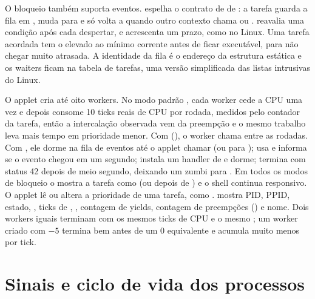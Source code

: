O bloqueio tamb\'em suporta eventos.  espelha o contrato de
 de : a tarefa guarda a
fila em , muda para  e s\'o volta a
 quando outro contexto chama  ou
.  reavalia uma condi\c{c}\~ao ap\'os
cada despertar, e  acrescenta um prazo, como
 no Linux. Uma tarefa acordada tem o
 elevado ao m\'inimo corrente antes de ficar execut\'avel, para
n\~ao chegar muito atrasada. A identidade da fila \'e o endere\c{c}o da
estrutura est\'atica e os waiters ficam na tabela de tarefas, uma vers\~ao
simplificada das listas intrusivas do Linux.

O applet 
cria at\'e oito workers. No modo padr\~ao , cada worker cede a CPU
uma vez e depois consome 10 ticks reais de CPU por rodada, medidos pelo
contador  da tarefa, ent\~ao a intercala\c{c}\~ao observada vem
da preemp\c{c}\~ao e o mesmo trabalho leva mais tempo em prioridade menor. Com
 (), o worker chama 
entre as rodadas. Com , ele dorme na fila de eventos at\'e o applet
 chamar  (ou  para
);  usa  e informa se
o evento chegou em um segundo;  instala um handler de
 e dorme;  termina com status 42 depois de meio
segundo, deixando um zumbi para . Em todos os modos de bloqueio o
 mostra a tarefa como  (ou  depois de
) e o shell continua responsivo. O applet
 l\^e ou altera a prioridade de uma tarefa, como
.  mostra PID, PPID, estado, , ticks de
, , contagem de yields, contagem de
preemp\c{c}\~oes () e nome. Dois workers iguais terminam com os
mesmos ticks de CPU e o mesmo ; um worker criado com
 $-5$ termina bem antes de um  $0$ equivalente e
acumula muito menos  por tick.

\section{Sinais e ciclo de vida dos processos}


